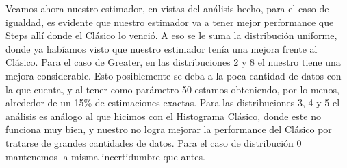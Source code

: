 Veamos ahora nuestro estimador, en vistas del análisis hecho, para el caso de igualdad, es evidente que nuestro estimador va a tener mejor performance que Steps allí donde el Clásico lo venció. A eso se le suma la distribución uniforme, donde ya habíamos visto que nuestro estimador tenía una mejora frente al Clásico.
Para el caso de Greater, en las distribuciones 2 y 8 el nuestro tiene una mejora considerable. Esto posiblemente se deba a la poca cantidad de datos con la que cuenta, y al tener como parámetro 50 estamos obteniendo, por lo menos, alrededor de un 15\% de estimaciones exactas. Para las distribuciones 3, 4 y 5 el análisis es análogo al que hicimos con el Histograma Clásico, donde este no funciona muy bien, y nuestro no logra mejorar la performance del Clásico por tratarse de grandes cantidades de datos. Para el caso de distribución 0 mantenemos la misma incertidumbre que antes.

